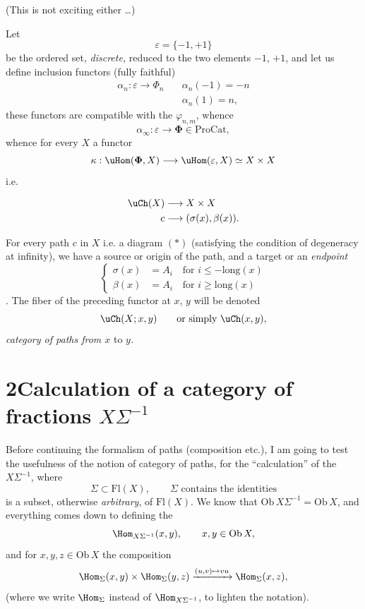 
(This is not exciting either \dots)

Let
\[
\varepsilon=\{-1,+1\}
\]
be the ordered set, \textit{discrete,} reduced to the two elements $-1$, $+1$, and let us define inclusion functors (fully faithful)
\[
\begin{aligned}
\alpha_n:\varepsilon\longrightarrow\Phi_n\quad & \alpha_n(-1)=-n\\
& \alpha_n(1)=n,
\end{aligned}
\]
these functors are compatible with the $\varphi_{n,m}$, whence %
\[
\alpha_\infty:\varepsilon\longrightarrow\boldsymbol{\Phi}\in\mathrm{ProCat},
\]
whence for every $X$ a functor
\[
\kappa:\uHom(\boldsymbol{\Phi},X)\longrightarrow\uHom(\varepsilon,X)\simeq X\times X
\]
i.e.

\[
\begin{aligned}
\uCh(X) &\longrightarrow X\times X\\
c &\longrightarrow (\sigma(x),\beta(x)).
\end{aligned}
\]

 For every path $c$ in $X$ i.e. a diagram $(*)$ (satisfying the condition of degeneracy at infinity), we have a source or origin of the path, and a target or an \textit{endpoint}
\[
\left\{
\begin{aligned}
\sigma(x) &= A_i\quad\text{for } i\leq -\mathrm{long}(x)\\
\beta(x) &= A_i\quad\text{for } i\geq \mathrm{long}(x)
\end{aligned}
\right.
\]
. The fiber of the preceding functor at $x$, $y$ will be denoted
\[
\uCh(X;x,y)\qquad\text{or simply }\uCh(x,y),
\]
\textit{category of paths from $x$} to \textit{$y$.}


\section*{2\quad Calculation of a category of fractions $X\Sigma^{-1}$}

Before continuing the formalism of paths (composition etc.), I am going to test the usefulness of the notion of category of paths, for the ``calculation'' of the $X\Sigma^{-1}$, where
\[
\Sigma\subset\mathrm{Fl}(X),\qquad\Sigma\text{ contains the identities}
\]
is a subset, otherwise \textit{arbitrary}, of $\mathrm{Fl}(X)$. We know that $\mathrm{Ob}\,X\Sigma^{-1}=\mathrm{Ob}\,X$, and everything comes down to defining the
\[
\Hom_{X\Sigma^{-1}}(x,y),\qquad x,y\in\mathrm{Ob}\,X,
\]
and for $x,y,z\in\mathrm{Ob}\,X$ the composition
\[
\Hom_\Sigma(x,y)\times\Hom_\Sigma(y,z)\xrightarrow{(u,v)\mapsto vu}\Hom_\Sigma(x,z),
\]
(where we write $\Hom_\Sigma$ instead of $\Hom_{X\Sigma^{-1}}$, to lighten the notation).


